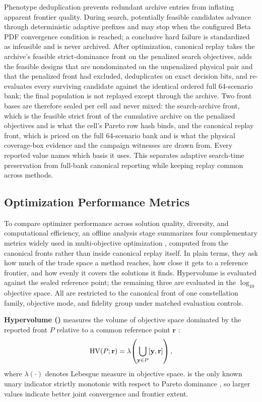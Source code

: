         Phenotype deduplication prevents redundant archive entries from inflating apparent frontier quality. During search, potentially feasible candidates advance through deterministic adaptive prefixes and may stop when the configured Beta PDF convergence condition is reached; a conclusive hard failure is standardized as infeasible and is never archived. After optimization, canonical replay takes the archive's feasible strict-dominance front on the penalized search objectives, adds the feasible designs that are nondominated on the unpenalized physical pair and that the penalized front had excluded, deduplicates on exact decision bits, and re-evaluates every surviving candidate against the identical ordered full 64-scenario bank; the final population is not replayed except through the archive. Two front bases are therefore sealed per cell and never mixed: the search-archive front, which is the feasible strict front of the cumulative archive on the penalized objectives and is what the cell's Pareto row hash binds, and the canonical replay front, which is priced on the full 64-scenario bank and is what the physical coverage-box evidence and the campaign witnesses are drawn from. Every reported value names which basis it uses. This separates adaptive search-time preservation from full-bank canonical reporting while keeping replay common across methods.

        \subsection{Optimization Performance Metrics} \label{ss:perf_metrics}
        To compare optimizer performance across solution quality, diversity, and computational efficiency, an offline analysis stage summarizes four complementary metrics widely used in multi-objective optimization \cite{riquelme2015metrics}, computed from the canonical fronts rather than inside canonical replay itself. In plain terms, they ask how much of the trade space a method reaches, how close it gets to a reference frontier, and how evenly it covers the solutions it finds. Hypervolume is evaluated against the sealed reference point; the remaining three are evaluated in the \(\log_{10}\) objective space. All are restricted to the canonical front of one constellation family, objective mode, and fidelity group under matched evaluation controls.

        \textbf{Hypervolume (\HV{})} measures the volume of objective space dominated by the reported front \(P\) relative to a common reference point \(\mathbf{r}\) \cite{zitzler2007hypervolume}:
        \begin{equation}
            \mathrm{HV}(P;\mathbf{r})=\lambda\!\left(\bigcup_{\mathbf{y}\in P}[\mathbf{y},\mathbf{r}]\right),
        \end{equation}
        where \(\lambda(\cdot)\) denotes Lebesgue measure in objective space. \HV{} is the only known unary indicator strictly monotonic with respect to Pareto dominance \cite{zitzler2003performance}, so larger values indicate better joint convergence and frontier extent.


